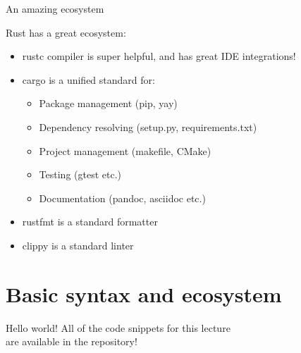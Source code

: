 \documentclass[usenames,dvipsnames,10pt,aspectratio=169]{beamer}
\begin{document}
\begin{frame}{An amazing ecosystem} 
\vspace{0.25cm}

\large
Rust has a great ecosystem:
\begin{itemize}[label=$\bullet$]
	\item \textcolor{ucuyellow}{rustc} compiler is super helpful, and has great IDE integrations!
	\item \textcolor{ucuyellow}{cargo} is a unified standard for:
		\begin{itemize}[label=$\bullet$]
			\item Package management (pip, yay)
			\item Dependency resolving (setup.py, requirements.txt)
			\item Project management (makefile, CMake)
			\item Testing (gtest etc.)
			\item Documentation (pandoc, asciidoc etc.)
		\end{itemize}
	\item \textcolor{ucuyellow}{rustfmt} is a standard formatter
	\item \textcolor{ucuyellow}{clippy} is a standard linter
\end{itemize}
\vspace{0.55cm}
\end{frame}


\section{Basic syntax and ecosystem}

\begin{frame}{Hello world!}
	\large
	\textcolor{ucuyellow}{
	All of the code snippets for this lecture\\
	are available in the repository!}
	\vspace{0.5cm}
	\inputminted[fontsize=\Large]{rust}{code/helloworld.rs}
	\vspace{0.4cm}
	\inputminted[fontsize=\Large]{bash}{code/helloworld.sh}

\end{frame}
\end{document}
